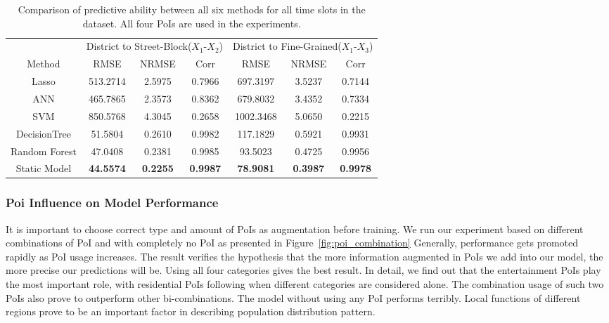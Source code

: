 \documentclass[letterpaper]{article} %
\begin{document}
\begin{table*}[h]
\small
\centering
\begin{tabular}{ccccccc}
\toprule
& \multicolumn{3}{c}{District to Street-Block($X_1$-$X_2$)} & 
\multicolumn{3}{c}{District to Fine-Grained($X_1$-$X_3$)}\\
Method&RMSE&NRMSE&Corr&RMSE&NRMSE&Corr\\
\midrule
Lasso&513.2714&2.5975&0.7966&697.3197&3.5237&0.7144\\
ANN&465.7865&2.3573&0.8362&679.8032&3.4352&0.7334\\
SVM &850.5768&4.3045&0.2658&1002.3468&5.0650&0.2215\\
DecisionTree &51.5804&0.2610&0.9982 &117.1829&0.5921&0.9931\\
Random Forest &47.0408 &0.2381 &0.9985&93.5023 &0.4725 &0.9956 \\
Static Model&\textbf{44.5574}&\textbf{0.2255}&\textbf{0.9987}
&\textbf{78.9081}&\textbf{0.3987}&\textbf{0.9978}\\
\bottomrule
\end{tabular}
\caption{Comparison of predictive ability between all six methods for all time slots in the dataset. All four PoIs are used in the experiments.} \label{tab:overall performance}

\end{table*}


\subsubsection{Poi Influence on Model Performance}
It is important to choose correct type and amount of PoIs as augmentation before training. We run our experiment based on different combinations of PoI and with completely no PoI as presented in Figure~\ref{fig:poi_combination} 
Generally, performance gets promoted rapidly as PoI usage increases. The result verifies the hypothesis that the more information augmented in PoIs we add into our model, the more precise our predictions will be. Using all four categories gives the best result. In detail, we find out that the entertainment PoIs play the most important role, with residential PoIs following when different categories are considered alone. The combination usage of such two PoIs also prove to outperform other bi-combinations. The model without using any PoI performs terribly. Local functions of different regions prove to be an important factor in describing population distribution pattern.
\end{document}
